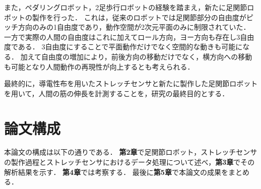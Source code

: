 また，ペダリングロボット，2足歩行ロボットの経験を踏まえ，新たに足関節ロボットの製作を行った．
これは，従来のロボットでは足関節部分の自由度がピッチ方向のみの1自由度であり，動作空間が2次元平面のみに制限されていた．
一方で実際の人間の自由度はこれに加えてロール方向，ヨー方向も存在し3自由度である．
3自由度にすることで平面動作だけでなく空間的な動きも可能になる．
加えて自由度の増加により，前後方向の移動だけでなく，横方向への移動も可能となり人間動作の再現性が向上するとも考えられる．

最終的に，導電性布を用いたストレッチセンサと新たに製作した足関節ロボットを用いて，人間の筋の伸長を計測することを，研究の最終目的とする．

\section{論文構成}
本論文の構成は以下の通りである．
{\bf 第2章}で足関節ロボット，ストレッチセンサの製作過程とストレッチセンサにおけるデータ処理について述べ，{\bf 第3章}でその解析結果を示す．
{\bf 第4章}では考察する． %
最後に{\bf 第5章}で本論文の成果をまとめる．
